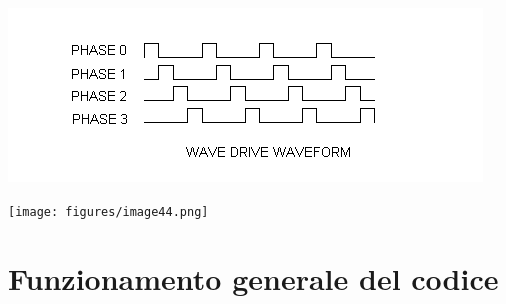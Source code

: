 \begin{center}
\includegraphics[scale=0.8]{figures/image50.png}
\end{center}

\begin{center}
\texttt{[image: figures/image44.png]}
\captionsetup{type=figure}
\end{center}

\hypertarget{funzionamento-generale-del-codice}{%
\section{Funzionamento generale del
codice}\label{funzionamento-generale-del-codice}}

